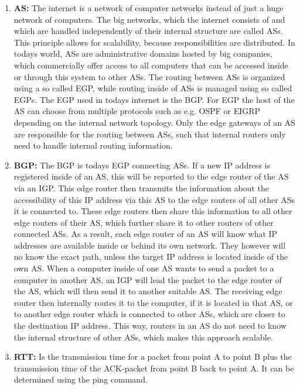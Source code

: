 \begin{enumerate}
            .
      \item \textbf{\ac{AS}:} The internet is a network of computer networks instead of just a huge network of computers. The big networks, which the internet consists of and which are handled independently of their internal structure are called \acp{AS}. This principle allows for scalability, because responsibilities are distributed. In todays world, \acp{AS} are administrative domains hosted by big companies, which commercially offer access to all computers that can be accessed inside or through this system to other \acp{AS}. The routing between \acp{AS} is organized using a so called \ac{EGP}, while routing inside of \acp{AS} is managed using so called \ac{EGP}s. The \ac{EGP} used in todays internet is the \ac{BGP}. For \ac{EGP} the host of the \ac{AS} can choose from multiple protocols such as e.g. \ac{OSPF} or \ac{EIGRP} depending on the internal network topology. Only the edge gateways of an \ac{AS} are responsible for the routing between \acp{AS}, such that internal routers only need to handle internal routing information.
      \item \textbf{\acf{BGP}:} The \ac{BGP} is todays \acs{EGP} connecting \acp{AS}. If a new IP address is registered inside of an \ac{AS}, this will be reported to the edge router of the \ac{AS} via an \ac{IGP}. This edge router then transmits the information about the accessibility of this IP address via this \ac{AS} to the edge routers of all other \acp{AS} it is connected to. These edge routers then share this information to all other edge routers of their \ac{AS}, which further share it to other routers of other connected \acp{AS}. As a result, each edge router of an \ac{AS} will know what IP addresses are available inside or behind its own network. They however will no know the exact path, unless the target IP address is located inside of the own \ac{AS}. When a computer inside of one \ac{AS} wants to send a packet to a computer in another \ac{AS}, an \ac{IGP} will lead the packet to the edge router of the \ac{AS}, which will then send it to another suitable \ac{AS}. The receiving edge router then internally routes it to the computer, if it is located in that \ac{AS}, or to another edge router which is connected to other \acp{AS}, which are closer to the destination IP address. This way, routers in an \ac{AS} do not need to know the internal structure of other \acp{AS}, which makes this approach scalable.
      \item \textbf{\acf{RTT}:} Is the transmission time for a packet from point A to point B plus the transmission time of the ACK-packet from point B back to point A. It can be determined using the ping command.

\end{enumerate}
